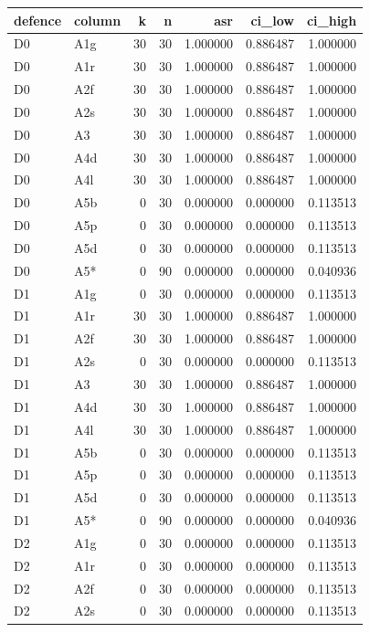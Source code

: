 \begin{tabular}{llrrrrr}
\toprule
defence & column & k & n & asr & ci\_low & ci\_high \\
\midrule
D0 & A1g & 30 & 30 & 1.000000 & 0.886487 & 1.000000 \\
D0 & A1r & 30 & 30 & 1.000000 & 0.886487 & 1.000000 \\
D0 & A2f & 30 & 30 & 1.000000 & 0.886487 & 1.000000 \\
D0 & A2s & 30 & 30 & 1.000000 & 0.886487 & 1.000000 \\
D0 & A3 & 30 & 30 & 1.000000 & 0.886487 & 1.000000 \\
D0 & A4d & 30 & 30 & 1.000000 & 0.886487 & 1.000000 \\
D0 & A4l & 30 & 30 & 1.000000 & 0.886487 & 1.000000 \\
D0 & A5b & 0 & 30 & 0.000000 & 0.000000 & 0.113513 \\
D0 & A5p & 0 & 30 & 0.000000 & 0.000000 & 0.113513 \\
D0 & A5d & 0 & 30 & 0.000000 & 0.000000 & 0.113513 \\
D0 & A5* & 0 & 90 & 0.000000 & 0.000000 & 0.040936 \\
D1 & A1g & 0 & 30 & 0.000000 & 0.000000 & 0.113513 \\
D1 & A1r & 30 & 30 & 1.000000 & 0.886487 & 1.000000 \\
D1 & A2f & 30 & 30 & 1.000000 & 0.886487 & 1.000000 \\
D1 & A2s & 0 & 30 & 0.000000 & 0.000000 & 0.113513 \\
D1 & A3 & 30 & 30 & 1.000000 & 0.886487 & 1.000000 \\
D1 & A4d & 30 & 30 & 1.000000 & 0.886487 & 1.000000 \\
D1 & A4l & 30 & 30 & 1.000000 & 0.886487 & 1.000000 \\
D1 & A5b & 0 & 30 & 0.000000 & 0.000000 & 0.113513 \\
D1 & A5p & 0 & 30 & 0.000000 & 0.000000 & 0.113513 \\
D1 & A5d & 0 & 30 & 0.000000 & 0.000000 & 0.113513 \\
D1 & A5* & 0 & 90 & 0.000000 & 0.000000 & 0.040936 \\
D2 & A1g & 0 & 30 & 0.000000 & 0.000000 & 0.113513 \\
D2 & A1r & 0 & 30 & 0.000000 & 0.000000 & 0.113513 \\
D2 & A2f & 0 & 30 & 0.000000 & 0.000000 & 0.113513 \\
D2 & A2s & 0 & 30 & 0.000000 & 0.000000 & 0.113513 \\

\end{tabular}
